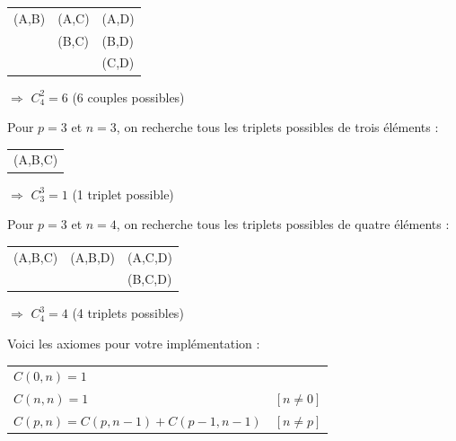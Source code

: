 \documentclass[11pt,a4paper]{article}
\begin{document}
\begin{table}[h!]
  \centering
  \begin{tabular}{l l l}
(A,B) & (A,C) & (A,D) \\
      & (B,C) & (B,D) \\
      &       & (C,D)
  \end{tabular}
\end{table}

\hspace*{3cm} $\Rightarrow$ $ C^{2}_{4} = 6 $ \hspace*{1cm} (6 couples possibles)

\bigskip

Pour $ p = 3 $ et $ n = 3 $, on recherche tous les triplets possibles de trois éléments :

\begin{table}[h!]
  \centering
  \begin{tabular}{l}
(A,B,C) \\
  \end{tabular}
\end{table}

\hspace*{3cm} $\Rightarrow$ $ C^{3}_{3} = 1 $ \hspace*{1cm} (1 triplet possible)

\bigskip

Pour $ p = 3 $ et $ n = 4 $, on recherche tous les triplets possibles de quatre éléments :

\begin{table}[h!]
  \centering
  \begin{tabular}{l l l}
(A,B,C) & (A,B,D) & (A,C,D) \\
        &         & (B,C,D) \\
  \end{tabular}
\end{table}

\hspace*{3cm} $\Rightarrow$ $ C^{3}_{4} = 4 $ \hspace*{1cm} (4 triplets possibles)

\bigskip

Voici les axiomes pour votre implémentation :

\begin{table}[h!]
  \centering
  \begin{tabular}{l l}
$ C(0,n) = 1 $                             & \\
$ C(n,n) = 1 $                             & $ [n \neq 0] $ \\
$ C(p,n) = C(p, n - 1) + C(p - 1, n - 1) $ & $ [n \neq p] $ \\
  \end{tabular}
\end{table}
\end{document}
